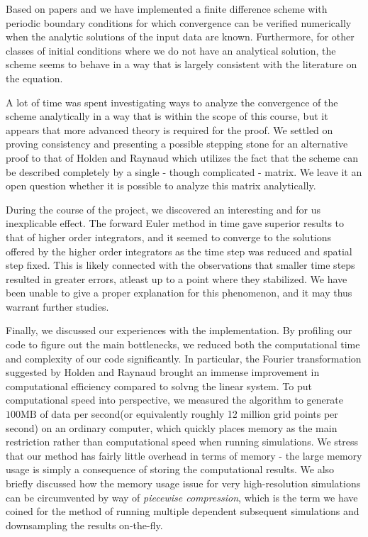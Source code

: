 Based on papers \cite{holden2006convergence} and \cite{dahlby2007geometric} we have implemented a finite difference scheme with periodic boundary conditions for which convergence can be verified numerically when the analytic solutions of the input data are known. Furthermore, for other classes of initial conditions where we do not have an analytical solution, the scheme seems to behave in a way that is largely consistent with the literature on the equation. 

A lot of time was spent investigating ways to analyze the convergence of the scheme analytically in a way that is within the scope of this course, but it appears that more advanced theory is required for the proof. We settled on proving consistency and presenting a possible stepping stone for an alternative proof to that of Holden and Raynaud which utilizes the fact that the scheme can be described completely by a single - though complicated - matrix. We leave it an open question whether it is possible to analyze this matrix analytically. 

During the course of the project, we discovered an interesting and for us inexplicable effect. The forward Euler method in time gave superior results to that of higher order integrators, and it seemed to converge to the solutions offered by the higher order integrators as the time step was reduced and spatial step fixed. This is likely connected with the observations that smaller time steps resulted in greater errors, atleast up to a point where they stabilized. We have been unable to give a proper explanation for this phenomenon, and it may thus warrant further studies.

Finally, we discussed our experiences with the implementation. By profiling our code to figure out the main bottlenecks, we reduced both the computational time and complexity of our code significantly. In particular, the Fourier transformation suggested by Holden and Raynaud brought an immense improvement in computational efficiency compared to solvng the linear system. To put computational speed into perspective, we measured the algorithm to generate $100 \text{MB}$ of data per second(or equivalently roughly 12 million grid points per second) on an ordinary computer, which quickly places memory as the main restriction rather than computational speed when running simulations. We stress that our method has fairly little overhead in terms of memory - the large memory usage is simply a consequence of storing the computational results. We also briefly discussed how the memory usage issue for very high-resolution simulations can be circumvented by way of \emph{piecewise compression}, which is the term we have coined for the method of running multiple dependent subsequent simulations and downsampling the results on-the-fly.


